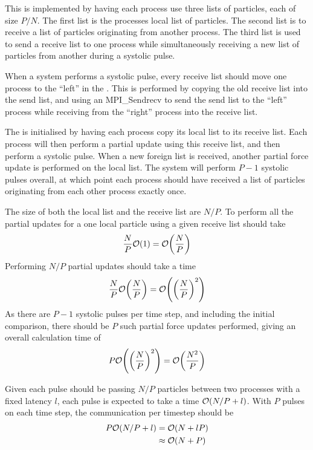 This is implemented by having each process use three lists of particles,
each of size $P/N$.
%
The first list is the processes local list of particles.
%
The second list is to receive a list of particles originating from
another process.
%
The third list is used to send a receive list
to one process while simultaneously receiving a new
list of particles from another
during a systolic pulse.

When a system performs a systolic pulse,
every receive list should move one process
to the ``left'' in the \systolicloop{}.
%
This is performed by copying the old receive list into the
send list, and using an MPI\_Sendrecv to send the send list to
the ``left'' process while receiving from
the ``right'' process into the receive list.

The \systolicloop{} is initialised by having each process
copy its local list to its receive list.
%
Each process will then perform a partial update using this receive
list, and then perform a systolic pulse.
%
When a new foreign list is received, another partial force update
is performed on the local list.
%
The system will perform $P-1$ systolic pulses overall, at which point
each process should have received a list of particles originating
from each other process exactly once.

The size of both the local list and the receive list are $N/P$.
%
To perform all the partial updates for a one local particle
using a given receive list should take
\begin{equation}
    \frac{N}{P}\mathcal{O}{\left({ 1 }\right)} = \mathcal{O}{\left({ \frac{N}{P} }\right)}
\end  {equation}
%
Performing $N/P$ partial updates should take a time
\begin{equation}
    \frac{N}{P}\mathcal{O}{\left({ \frac{N}{P} }\right)} = \mathcal{O}{\left({ \left( \frac{N}{P} \right)^2 }\right)}
\end  {equation}
%
As there are $P-1$ systolic pulses per time step, and including
the initial comparison, there should be $P$ such partial force updates
performed, giving an overall calculation time of
\begin{equation}
    P\mathcal{O}{\left({  \left(\frac{N}{P}\right)^2  }\right)} = \mathcal{O}{\left({ \frac{N^2}{P} }\right)}
\end  {equation}

Given each pulse should be passing $N/P$ particles between two processes
with a fixed latency $l$, each pulse is expected to take a time
$\mathcal{O}{\left({ N/P + l }\right)}$.
%
With $P$ pulses on each time step, the communication per timestep should be
\begin{align}
    P\mathcal{O}{\left({ N/P + l }\right)} &= \mathcal{O}{\left({ N + lP }\right)} \\
                    &\approx{} \mathcal{O}{\left({ N + P }\right)}
\end  {align}

